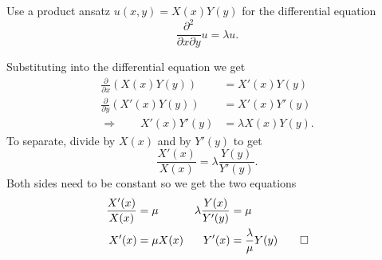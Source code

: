 Use a product ansatz $u(x,y) = X(x)Y(y)$ 
for the differential equation
\[
\frac{\partial^2}{\partial x \partial y} u
=
\lambda u.
\]

\begin{loesung}
Substituting into the differential equation we get
\begin{align*}
\frac{\partial}{\partial x} (X(x)Y(y))
&=
X'(x) Y(y)
\\
\frac{\partial}{\partial y} (X'(x)Y(y))
&=
X'(x)Y'(y)
\\
\Rightarrow\qquad
X'(x) Y'(y) &= \lambda X(x) Y(y).
\end{align*}
To separate, divide by $X(x)$ and by $Y'(y)$ to get
\[
\frac{X'(x)}{X(x)}
=
\lambda
\frac{Y(y)}{Y'(y)}.
\]
Both sides need to be constant so we get the two equations
\begin{align*}
\frac{X'(x)}{X(x)}&=\mu
&
\lambda\frac{Y(x)}{Y'(y)}&=\mu
\\
X'(x)&=\mu X(x)
&
Y'(x)&=\frac{\lambda}{\mu}Y(y)
\qedhere
\end{align*}
\end{loesung}
